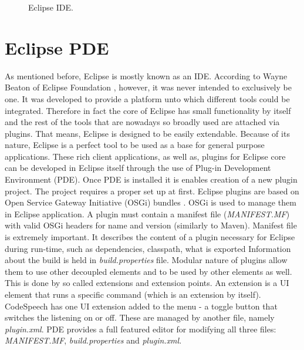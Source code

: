 \begin{figure}
    \centering
    \caption{Eclipse IDE.}
    \label{fig:eclipseIDE}
\end{figure}

\section{Eclipse PDE}

As mentioned before, Eclipse is mostly known as an IDE. According to Wayne Beaton of Eclipse Foundation \cite{Beaton2013}, however, it was never intended to exclusively be one. It was developed to provide a platform unto which different tools could be integrated. Therefore in fact the core of Eclipse has small functionality by itself and the rest of the tools that are nowadays so broadly used are attached via plugins. That means, Eclipse is designed to be easily extendable. Because of its nature, Eclipse is a perfect tool to be used as a base for general purpose applications. These rich client applications, as well as, plugins for Eclipse core can be developed in Eclipse itself through the use of Plug-in Development Environment (PDE). Once PDE is installed it is enables creation of a new plugin project. The project requires a proper set up at first. Eclipse plugins are based on Open Service Gateway Initiative (OSGi) bundles \cite{Rouse2011}. OSGi is used to manage them in Eclipse application. A plugin must contain a manifest file (\textit{MANIFEST.MF}) with valid OSGi headers for name and version (similarly to Maven). Manifest file is extremely important. It describes the content of a plugin necessary for Eclipse during run-time, such as dependencies, classpath, what is exported \etc Information about the build is held in \textit{build.properties} file. Modular nature of plugins allow them to use other decoupled elements and to be used by other elements as well. This is done by so called extensions and extension points. An extension is \eg a UI element that runs a specific command (which is an extension by itself). CodeSpeech has one UI extension added to the menu - a toggle button that switches the listening on or off. These are managed by another file, namely \textit{plugin.xml}. PDE provides a full featured editor for modifying all three files: \textit{MANIFEST.MF}, \textit{build.properties} and \textit{plugin.xml}.


